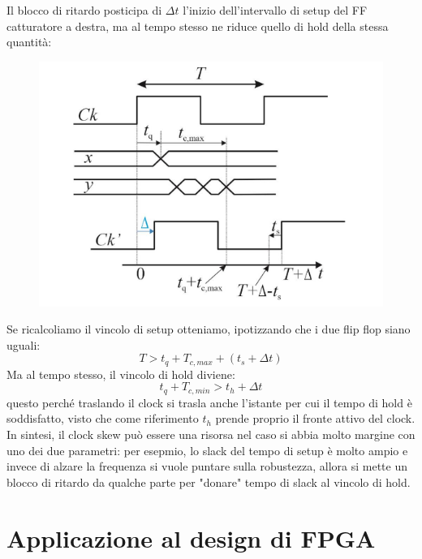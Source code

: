 \documentclass{book}
\begin{document}
        Il blocco di ritardo posticipa di $\Delta t$ l'inizio dell'intervallo di setup del FF catturatore a destra, 
        ma al tempo stesso ne riduce quello di hold della stessa quantità:
        \begin{figure}[h!]
            \center  
            \includegraphics[width=0.5\linewidth]{img/chapt12img6.png}
        \end{figure}
        Se ricalcoliamo il vincolo di setup otteniamo, ipotizzando che i due flip flop siano uguali:
        \begin{equation}
                T>t_{q}+T_{c, max}+(t_{s}+\Delta t)
        \end{equation}
        Ma al tempo stesso, il vincolo di hold diviene:
        \begin{equation}
            t_{q}+T_{c,min}>t_{h}+\Delta t
        \end{equation}
        questo perché traslando il clock si trasla anche l'istante per cui il tempo di hold è soddisfatto, visto che come 
        riferimento $t_{h}$ prende proprio il fronte attivo del clock. In sintesi, il clock skew può essere una risorsa nel caso
        si abbia molto margine con uno dei due parametri: per esepmio, lo slack del tempo di setup è molto ampio e invece di alzare la frequenza 
        si vuole puntare sulla robustezza, allora si mette un blocco di ritardo da qualche parte per "donare" tempo di slack al vincolo di hold.
        \newpage
        \section{Applicazione al design di FPGA}
\end{document}
